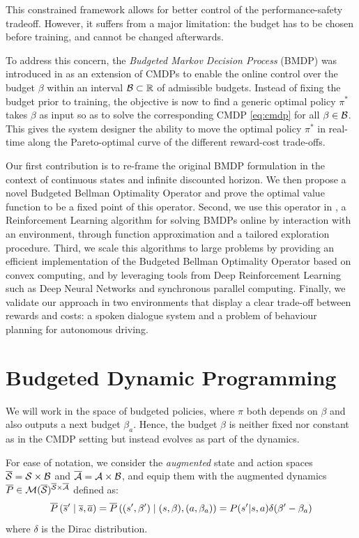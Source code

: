 \documentclass{article}
\begin{document}
This constrained framework allows for better control of the performance-safety tradeoff. However, it suffers from a major limitation: the budget has to be chosen before training, and cannot be changed afterwards.

To address this concern, the \emph{Budgeted Markov Decision Process} (BMDP) was introduced in \citep{Boutilier_Lu:uai16} as an extension of CMDPs to enable the online control over the budget $\beta$ within an interval $\mathcal{B} \subset \mathbb{R}$ of admissible budgets. Instead of fixing the budget prior to training, the objective is now to find a generic optimal policy $\pi^*$ takes $\beta$ as input so as to solve the corresponding CMDP \eqref{eq:cmdp} for all $\beta\in\mathcal{B}$. This gives the system designer the ability to move the optimal policy $\pi^*$ in real-time along the Pareto-optimal curve of the different reward-cost trade-offs.

Our first contribution is to re-frame the original BMDP formulation in the context of continuous states and infinite discounted horizon. We then propose a novel Budgeted Bellman Optimality Operator and prove the optimal value function to be a fixed point of this operator. Second, we use this operator in \BFTQ, a Reinforcement Learning algorithm for solving BMDPs online by interaction with an environment, through function approximation and a tailored exploration procedure. Third, we scale this algorithms to large problems by providing an efficient implementation of the Budgeted Bellman Optimality Operator based on convex computing, and by leveraging tools from Deep Reinforcement Learning such as Deep Neural Networks and synchronous parallel computing. Finally, we validate our approach in two environments that display a clear trade-off between rewards and costs: a spoken dialogue system and a problem of behaviour planning for autonomous driving.

\section{Budgeted Dynamic Programming}

We will work in the space of budgeted policies, where $\pi$ both depends on $\beta$ and also outputs a next budget $\beta_a$. Hence, the budget $\beta$ is neither fixed nor constant as in the CMDP setting but instead evolves as part of the dynamics.

For ease of notation, we consider the \emph{augmented} state and action spaces $\overline{\mathcal{S}} = \mathcal{S}\times \mathcal{B}$ and $\overline{\mathcal{A}}= \mathcal{A}\times \mathcal{B}$, and equip them with the augmented dynamics $\overline{P}\in \mathcal{M}(\overline{\mathcal{S}})^{\overline{\mathcal{S}} \times \overline{\mathcal{A}}}$ defined as:
\begin{equation*}
    \overline{P}\left(\overline{s}' \;\middle|\; \overline{s}, \overline{a}\right) = \overline{P}\left((s',\beta') \;\middle|\; (s,\beta), (a, \beta_a)\right) = P(s'|s, a)\delta(\beta' - \beta_a)
\end{equation*}
where $\delta$ is the Dirac distribution. 
\end{document}
